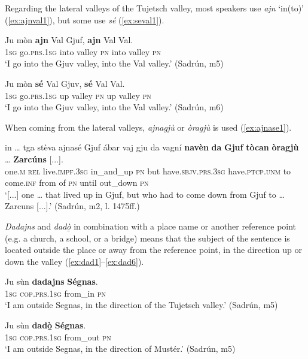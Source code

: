 Regarding the lateral valleys of the Tujetsch valley, most speakers use \textit{ajn} `in(to)' (\ref{ex:ajnval1}), but some use \textit{sé} (\ref{ex:seval1}).

\ea
\label{ex:ajnval1}
\gll Ju mòn \textbf{ajn} Val Gjuf, \textbf{ajn} Val Val.\\
\textsc{1sg} go.\textsc{prs.1sg} into valley \textsc{pn} into valley \textsc{pn}\\
\glt `I go into the Gjuv valley, into the Val valley.' (Sadrún, m5)
\z

\ea
\label{ex:seval1}
\gll Ju mòn \textbf{sé} Val Gjuv, \textbf{sé} Val Val.\\
\textsc{1sg} go.\textsc{prs.1sg} up valley \textsc{pn} up valley \textsc{pn}\\
\glt `I go into the Gjuv valley, into the Val valley.' (Sadrún, m6)
\z

When coming from the lateral valleys, \textit{ajnagjù} or \textit{òragjù} is used (\ref{ex:ajnase1}).

\ea
\label{ex:ajnase1}
\gll [...] in … tga stèva ajnasé Gjuf ábar vaj gju da vagní \textbf{navèn} \textbf{da} \textbf{Gjuf} \textbf{tòcan} \textbf{òragjù} … \textbf{Zarcúns}  [...].\\
{} one.\textsc{m} {} \textsc{rel} live.\textsc{impf.3sg} in\_and\_up \textsc{pn} but  have.\textsc{sbjv.prs.3sg} have.\textsc{ptcp.unm} to come.\textsc{inf} from of \textsc{pn} until out\_down {} \textsc{pn} \\
\glt `[...] one … that lived up in Gjuf, but who had to come down from Gjuf to … Zarcuns [...].' (Sadrún, m2, l. 1475ff.)
\z

\textit{Dadajns} and \textit{dadò̱} in combination with a place name or another reference point (e.g. a church, a school, or a bridge) means that the subject of the sentence is located outside the place or away from the reference point, in the direction up or down the valley (\ref{ex:dad1}--\ref{ex:dad6}).

\ea
\label{ex:dad1}
\gll Ju sùn \textbf{dadajns} \textbf{Ségnas}.\\
\textsc{1sg} \textsc{cop.prs.1sg} from\_in \textsc{pn}\\
\glt `I am outside Segnas, in the direction of the Tujetsch valley.' (Sadrún, m5)
\z

\ea
\label{ex:dad2}
\gll Ju sùn \textbf{dadò̱} \textbf{Ségnas}.\\
\textsc{1sg} \textsc{cop.prs.1sg} from\_out \textsc{pn}\\
\glt `I am outside Segnas, in the direction of Mustér.' (Sadrún, m5)
\z

